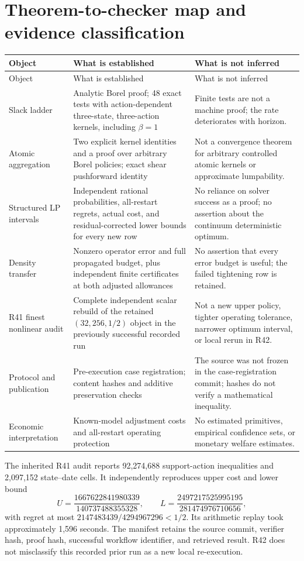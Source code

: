 \section{Theorem-to-checker map and evidence classification}
\begin{longtable}{p{}p{}p{}}
\toprule Object&What is established&What is not inferred\\\midrule\endfirsthead
\toprule Object&What is established&What is not inferred\\\midrule\endhead
Slack ladder&Analytic Borel proof; 48 exact tests with action-dependent three-state, three-action kernels, including $\beta=1$&Finite tests are not a machine proof; the rate deteriorates with horizon.\\
Atomic aggregation&Two explicit kernel identities and a proof over arbitrary Borel policies; exact shear pushforward identity&Not a convergence theorem for arbitrary controlled atomic kernels or approximate lumpability.\\
Structured LP intervals&Independent rational probabilities, all-restart regrets, actual cost, and residual-corrected lower bounds for every new row&No reliance on solver success as a proof; no assertion about the continuum deterministic optimum.\\
Density transfer&Nonzero operator error and full propagated budget, plus independent finite certificates at both adjusted allowances&No assertion that every error budget is useful; the failed tightening row is retained.\\
R41 finest nonlinear audit&Complete independent scalar rebuild of the retained $(32,256,1/2)$ object in the previously successful recorded run&Not a new upper policy, tighter operating tolerance, narrower optimum interval, or local rerun in R42.\\
Protocol and publication&Pre-execution case registration; content hashes and additive preservation checks&The source was not frozen in the case-registration commit; hashes do not verify a mathematical inequality.\\
Economic interpretation&Known-model adjustment costs and all-restart operating protection&No estimated primitives, empirical confidence sets, or monetary welfare estimates.\\
\bottomrule
\end{longtable}
The inherited R41 audit reports 92,274,688 support-action inequalities and 2,097,152 state--date cells. It independently reproduces upper cost and lower bound\[U=\frac{1667622841980339}{140737488355328},\qquad L=\frac{2497217525995195}{281474976710656},\]with regret at most $2147483439/4294967296<1/2$. Its arithmetic replay took approximately 1,596 seconds. The manifest retains the source commit, verifier hash, proof hash, successful workflow identifier, and retrieved result. R42 does not misclassify this recorded prior run as a new local re-execution.

